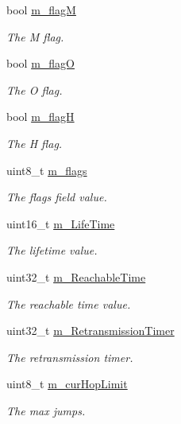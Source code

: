 \begin{DoxyCompactItemize}
\item 
bool \hyperlink{classns3_1_1Icmpv6RA_a162a725afd280e438c8c87ff5991aafd}{m\+\_\+flagM}
\begin{DoxyCompactList}\small\item\em The M flag. \end{DoxyCompactList}\item 
bool \hyperlink{classns3_1_1Icmpv6RA_a2fe5497dfcc81cdb2a1cbe7e81c7c9b1}{m\+\_\+flagO}
\begin{DoxyCompactList}\small\item\em The O flag. \end{DoxyCompactList}\item 
bool \hyperlink{classns3_1_1Icmpv6RA_ae67d2ed36a1b6ee63827af46687fc6fb}{m\+\_\+flagH}
\begin{DoxyCompactList}\small\item\em The H flag. \end{DoxyCompactList}\item 
uint8\+\_\+t \hyperlink{classns3_1_1Icmpv6RA_abe497e092c32d91921f4e446a0920080}{m\+\_\+flags}
\begin{DoxyCompactList}\small\item\em The flags field value. \end{DoxyCompactList}\item 
uint16\+\_\+t \hyperlink{classns3_1_1Icmpv6RA_aaafb2d6c2bd83baa13add360d9afd0f5}{m\+\_\+\+Life\+Time}
\begin{DoxyCompactList}\small\item\em The lifetime value. \end{DoxyCompactList}\item 
uint32\+\_\+t \hyperlink{classns3_1_1Icmpv6RA_adb771ec3d6a283e55d3ac133cfb28f91}{m\+\_\+\+Reachable\+Time}
\begin{DoxyCompactList}\small\item\em The reachable time value. \end{DoxyCompactList}\item 
uint32\+\_\+t \hyperlink{classns3_1_1Icmpv6RA_a920c069e9bd468d9f37ea19e59ea9abc}{m\+\_\+\+Retransmission\+Timer}
\begin{DoxyCompactList}\small\item\em The retransmission timer. \end{DoxyCompactList}\item 
uint8\+\_\+t \hyperlink{classns3_1_1Icmpv6RA_ab7b02456d8db642dc6923fbe8b970689}{m\+\_\+cur\+Hop\+Limit}
\begin{DoxyCompactList}\small\item\em The max jumps. \end{DoxyCompactList}\end{DoxyCompactItemize}
